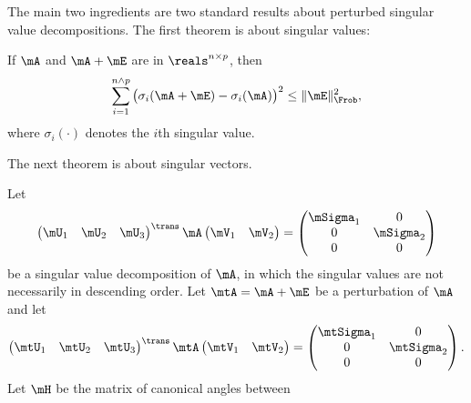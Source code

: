\clearpage

The main two ingredients are two standard results about perturbed singular value decompositions.  The first theorem is about singular values:

\begin{theorem}[Mirsky]
    If $\mA$ and $\mA + \mE$ are in $\reals^{n \times p}$, then
    \[
        \sum_{i=1}^{n \wedge p}
            \big(
                \sigma_i(\mA + \mE)
                -
                \sigma_i(\mA)
            \big)^2
        \leq
        \| \mE \|_\Frob^2,
    \]
    where $\sigma_i(\cdot)$ denotes the $i$th singular value.
\end{theorem}

\noindent
The next theorem is about singular vectors.

\begin{theorem}[Wedin]
    Let
    \[
        \left(
        \begin{matrix}
            \mU_1 & \mU_2 & \mU_3
        \end{matrix}
        \right)^\trans
        \mA
        \left(
        \begin{matrix}
            \mV_1 & \mV_2
        \end{matrix}
        \right)
        =
        \left(
        \begin{matrix}
            \mSigma_1 & 0 \\
            0         & \mSigma_2 \\
            0         & 0
        \end{matrix}
        \right)
    \]
    be a singular value decomposition of $\mA$, in which the singular
    values are not necessarily in descending order.  Let $\mtA = \mA + \mE$
    be a perturbation of $\mA$ and let
    \[
        \left(
        \begin{matrix}
            \mtU_1 & \mtU_2 & \mtU_3
        \end{matrix}
        \right)^\trans
        \mtA
        \left(
        \begin{matrix}
            \mtV_1 & \mtV_2
        \end{matrix}
        \right)
        =
        \left(
        \begin{matrix}
            \mtSigma_1 & 0 \\
            0          & \mtSigma_2 \\
            0          & 0
        \end{matrix}
        \right).
    \]
    Let $\mH$ be the matrix of canonical angles between

\end{theorem}
